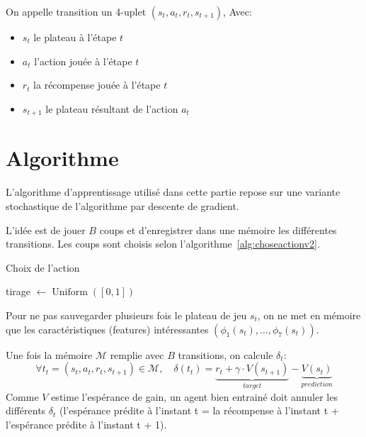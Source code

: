 \documentclass{report}
\DeclareMathOperator{\argmax}{argmax}
\DeclareMathOperator{\uniform}{Uniform}
\begin{document}
On appelle transition un 4-uplet \( (s_t, a_t, r_t, s_{t+1}) \), Avec:
\begin{itemize}
    \item \( s_t \) le plateau à l'étape \( t \)
    \item \( a_t \) l'action jouée à l'étape \( t \)
    \item \( r_t \) la récompense jouée à l'étape \( t \)
    \item \( s_{t+1} \) le plateau résultant de l'action \( a_t \)
\end{itemize}


\section{Algorithme}

L'algorithme d'apprentissage utilisé dans cette partie repose sur une variante
stochastique de l'algorithme par descente de gradient.

L'idée est de jouer \( B \) coups et d'enregistrer dans une mémoire les
différentes transitions. Les coups sont choisis selon
l'algorithme~\ref{alg:choseactionv2}.

\begin{algorithm}[h]
  \caption{Choix de l'action}\label{alg:choseactionv2}
  \begin{algorithmic}
    [1]
    \State{} tirage \(\gets \uniform([0, 1])\)
    \State{}\Return{\(\argmax_{{a_t}\in\mathcal{A}} [r_t + \gamma V(s_{t+1})] \)}
    \\ 
    \Else{}
    \State{}\Return{\(\uniform(\mathcal{A})\)}
    \EndIf{}
    \EndProcedure{}
  \end{algorithmic}
\end{algorithm}

Pour ne pas sauvegarder plusieurs fois le plateau de jeu \(s_t\), on ne met en
mémoire que les caractéristiques (features) intéressantes \( (\phi_1 (s_t), \hdots, \phi_7(s_t)) \).

Une fois la mémoire \( \mathcal{M} \) remplie avec \( B \) transitions, on
calcule \(\delta_t\):
\[
\forall t_t = (s_t, a_t, r_t, s_{t+1}) \in \mathcal{M},\quad
\delta(t_t) = \underbrace{r_t + \gamma \cdot V(s_{t+1})}_{target} -
\underbrace{V(s_{t})}_{prediction}
\]
Comme \( V \) estime l'espérance de gain, un agent bien entrainé doit annuler
les différents \(\delta_t\) (l'espérance prédite à l'instant t = la récompense
à l'instant t + l'espérance prédite à l'instant t + 1).
\end{document}
